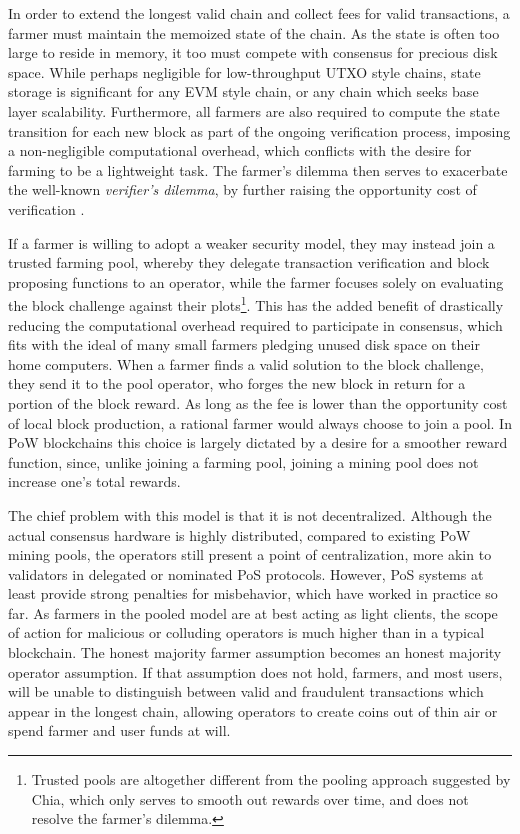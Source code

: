 \documentclass[conference]{IEEEtran}
\begin{document}
In order to extend the longest valid chain and collect fees for valid transactions, a farmer must maintain the memoized state of the chain. As the state is often too large to reside in memory, it too must compete with consensus for precious disk space. While perhaps negligible for low-throughput UTXO style chains, state storage is significant for any EVM style chain, or any chain which seeks base layer scalability. Furthermore, all farmers are also required to compute the state transition for each new block as part of the ongoing verification process, imposing a non-negligible computational overhead, which conflicts with the desire for farming to be a lightweight task. The farmer’s dilemma then serves to exacerbate the well-known \textit{verifier’s dilemma}, by further raising the opportunity cost of verification \cite{luu2015demystifying}. 

If a farmer is willing to adopt a weaker security model, they may instead join a trusted farming pool, whereby they delegate transaction verification and block proposing functions to an operator, while the farmer focuses solely on evaluating the block challenge against their plots\footnote{Trusted pools are altogether different from the pooling approach suggested by Chia, which only serves to smooth out rewards over time, and does not resolve the farmer's dilemma.}. This has the added benefit of drastically reducing the computational overhead required to participate in consensus, which fits with the ideal of many small farmers pledging unused disk space on their home computers. When a farmer finds a valid solution to the block challenge, they send it to the pool operator, who forges the new block in return for a portion of the block reward. As long as the fee is lower than the opportunity cost of local block production, a rational farmer would always choose to join a pool. In PoW blockchains this choice is largely dictated by a desire for a smoother reward function, since, unlike joining a farming pool, joining a mining pool does not increase one’s total rewards.

The chief problem with this model is that it is not decentralized. Although the actual consensus hardware is highly distributed, compared to existing PoW mining pools, the operators still present a point of centralization, more akin to validators in delegated or nominated PoS protocols. However, PoS systems at least provide strong penalties for misbehavior, which have worked in practice so far. As farmers in the pooled model are at best acting as light clients, the scope of action for malicious or colluding operators is much higher than in a typical blockchain. The honest majority farmer assumption becomes an honest majority operator assumption. If that assumption does not hold, farmers, and most users, will be unable to distinguish between valid and fraudulent transactions which appear in the longest chain, allowing operators to create coins out of thin air or spend farmer and user funds at will.
\end{document}
